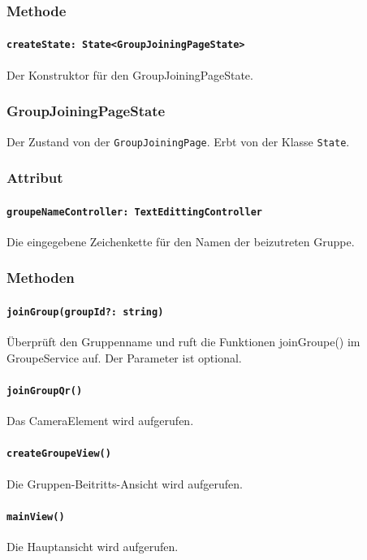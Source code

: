 \documentclass[parskip=full]{scrartcl}
\begin{document}
        \subsubsection*{Methode}
            \paragraph*{\texttt{createState: State<GroupJoiningPageState>}} Der Konstruktor für den GroupJoiningPageState.
    
    \subsubsection{GroupJoiningPageState}
    Der Zustand von der \texttt{GroupJoiningPage}. Erbt von der Klasse \texttt{State}.
        \subsubsection*{Attribut}
            \paragraph*{\texttt{groupeNameController: TextEdittingController}} Die eingegebene Zeichenkette für den Namen der beizutreten Gruppe.

        \subsubsection*{Methoden}
            \paragraph*{\texttt{joinGroup(groupId?: string)}} Überprüft den Gruppenname und ruft die Funktionen joinGroupe() im GroupeService auf. Der Parameter ist optional.
            \paragraph*{\texttt{joinGroupQr()}} Das CameraElement wird aufgerufen.
            \paragraph*{\texttt{createGroupeView()}}  Die Gruppen-Beitritts-Ansicht wird aufgerufen.
            \paragraph*{\texttt{mainView()}} Die Hauptansicht wird aufgerufen.
    
\end{document}
